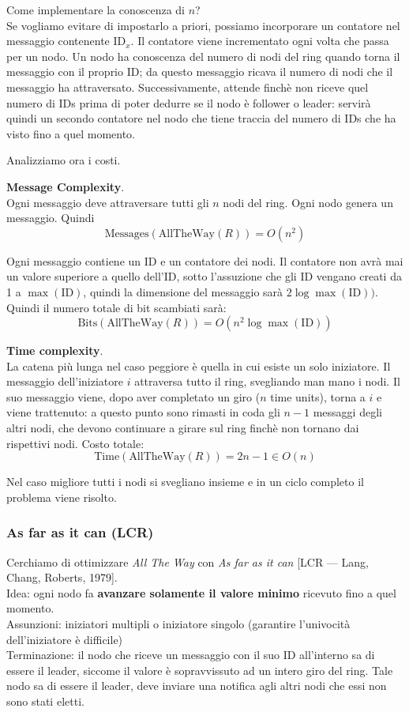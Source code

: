 Come implementare la conoscenza di $n$?\\
Se vogliamo evitare di impostarlo a priori, possiamo incorporare un contatore nel messaggio contenente $\text{ID}_x$.
Il contatore viene incrementato ogni volta che passa per un nodo.
Un nodo ha conoscenza del numero di nodi del ring quando torna il messaggio con il proprio ID; da questo messaggio ricava il numero
di nodi che il messaggio ha attraversato. Successivamente, attende finchè non riceve quel numero di IDs prima di poter dedurre se
il nodo è follower o leader: servirà quindi un secondo contatore nel nodo che tiene traccia del numero di IDs che ha visto fino a quel
momento.


Analizziamo ora i costi.

\textbf{Message Complexity}.\\
Ogni messaggio deve attraversare tutti gli $n$ nodi del ring.
Ogni nodo genera un messaggio.
Quindi $$ \text{Messages}(\text{AllTheWay}(R)) = O(n^2) $$

Ogni messaggio contiene un ID e un contatore dei nodi. Il contatore non avrà mai un valore superiore a quello dell'ID, sotto l'assuzione
che gli ID vengano creati da 1 a $\max (\text{ID})$, quindi la dimensione del messaggio sarà $2 \log \max (\text{ID}))$.
Quindi il numero totale di bit scambiati sarà: $$ \text{Bits}(\text{AllTheWay}(R)) = O(n^2 \log \max (\text{ID})) $$

\textbf{Time complexity}.\\
La catena più lunga nel caso peggiore è quella in cui esiste un solo iniziatore.
Il messaggio dell'iniziatore $i$ attraversa tutto il ring, svegliando man mano i nodi.
Il suo messaggio viene, dopo aver completato un giro ($n$ time units), torna a $i$ e viene trattenuto:
a questo punto sono rimasti in coda gli $n-1$ messaggi degli altri nodi, che devono continuare a girare sul ring finchè non tornano
dai rispettivi nodi. Costo totale:
$$ \text{Time}(\text{AllTheWay}(R)) = 2n-1 \in O(n) $$

Nel caso migliore tutti i nodi si svegliano insieme e in un ciclo completo il problema viene risolto.

\subsubsection{As far as it can (LCR)}
Cerchiamo di ottimizzare \textit{All The Way} con \textit{As far as it can} [LCR --- Lang, Chang, Roberts, 1979]. \\
Idea: ogni nodo fa \textbf{avanzare solamente il valore minimo} ricevuto fino a quel momento. \\
Assunzioni: iniziatori multipli o iniziatore singolo (garantire l'univocità dell'iniziatore è difficile) \\
Terminazione: il nodo che riceve un messaggio con il suo ID all'interno sa di essere il leader, siccome il valore è sopravvissuto ad
un intero giro del ring. Tale nodo sa di essere il leader, deve inviare una notifica agli altri nodi che essi non sono stati eletti. \\

